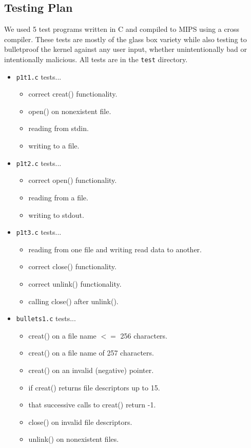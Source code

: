 \documentclass{article}
\begin{document}
\subsection{Testing Plan}
We used 5 test programs written in C and compiled to MIPS using a cross compiler. These tests are mostly of the glass box variety while also testing to bulletproof the kernel against any user input, whether unintentionally bad or intentionally malicious. All tests are in the \texttt{test} directory.
\begin{itemize}
\item \texttt{p1t1.c} tests... \begin{itemize}
\item correct creat() functionality.
\item open() on nonexistent file.
\item reading from stdin.
\item writing to a file.
\end{itemize}
\item \texttt{p1t2.c} tests... \begin{itemize}
\item correct open() functionality.
\item reading from a file.
\item writing to stdout.
\end{itemize}
\item \texttt{p1t3.c} tests... \begin{itemize}
\item reading from one file and writing read data to another.
\item correct close() functionality.
\item correct unlink() functionality.
\item calling close() after unlink().
\end{itemize}
\item \texttt{bullets1.c} tests... \begin{itemize}
\item creat() on a file name $<=$ 256 characters.
\item creat() on a file name of 257 characters.
\item creat() on an invalid (negative) pointer.
\item if creat() returns file descriptors up to 15.
\item that successive calls to creat() return -1.
\item close() on invalid file descriptors.
\item unlink() on nonexistent files.

\end{itemize}
\end{itemize}
\end{document}
